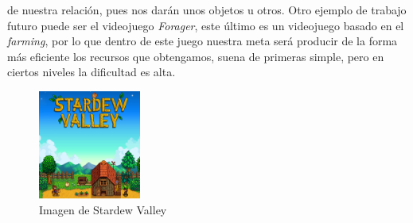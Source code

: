 \documentclass[a4paper]{article}
\begin{document}
de nuestra relación, pues nos darán unos objetos u otros. Otro ejemplo de trabajo futuro puede ser el videojuego \textit{Forager}, este último es un videojuego basado en el \textit{farming}, por lo que dentro de este juego nuestra meta será producir de la forma más eficiente los recursos que obtengamos,
suena de primeras simple, pero en ciertos niveles la dificultad es alta.
\begin{figure}[ht]
    \centering
    \includegraphics[width=0.3\textwidth]{Images/Logo_of_Stardew_Valley.png}
    \caption{Imagen de Stardew Valley}
    \label{fig:player}
\end{figure}
\clearpage
\end{document}
